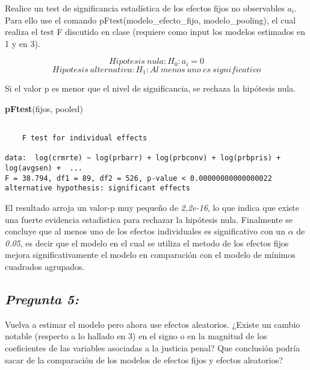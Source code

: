 \documentclass[
  12pt,
]{article}
\newenvironment{Shaded}{\begin{snugshade}}{\end{snugshade}}
\newcommand{\FunctionTok}[1]{\textcolor[rgb]{0.13,0.29,0.53}{\textbf{#1}}}
\newcommand{\NormalTok}[1]{#1}
\begin{document}
Realice un test de significancia estadística de los efectos fijos no
observables \(a_i\). Para ello use el comando
pFtest(modelo\_efecto\_fijo, modelo\_pooling), el cual realiza el test F
discutido en clase (requiere como input los modelos estimados en 1 y en
3).

\[Hipotesis\ nula: H_0 : a_i = 0 \]
\[Hipotesis\ alternativa: H_1 : Al\ menos\ uno\ es\ significativo\]

Si el valor p es menor que el nivel de significancia, se rechaza la
hipótesis nula.

\begin{Shaded}
\begin{Highlighting}[]
\FunctionTok{pFtest}\NormalTok{(fijos, pooled)}
\end{Highlighting}
\end{Shaded}

\begin{verbatim}

    F test for individual effects

data:  log(crmrte) ~ log(prbarr) + log(prbconv) + log(prbpris) + log(avgsen) +  ...
F = 38.794, df1 = 89, df2 = 526, p-value < 0.00000000000000022
alternative hypothesis: significant effects
\end{verbatim}

El resultado arroja un valor-p muy pequeño de \emph{2,2e-16}, lo que
indica que existe una fuerte evidencia estadistica para rechazar la
hipótesis nula. Finalmente se concluye que al menos uno de los efectos
individuales es significativo con un \(\alpha\) de \emph{0.05}, es decir
que el modelo en el cual se utiliza el metodo de los efectos fijos
mejora significativamente el modelo en comparación con el modelo de
mínimos cuadrados agrupados.

\subsection{\texorpdfstring{\textbf{\emph{Pregunta
5:}}}{Pregunta 5:}}\label{pregunta-5}

Vuelva a estimar el modelo pero ahora use efectos aleatorios. ¿Existe un
cambio notable (respecto a lo hallado en 3) en el signo o en la magnitud
de los coeficientes de las variables asociadas a la justicia penal? Que
conclusión podría sacar de la comparación de los modelos de efectos
fijos y efectos aleatorios?
\end{document}
